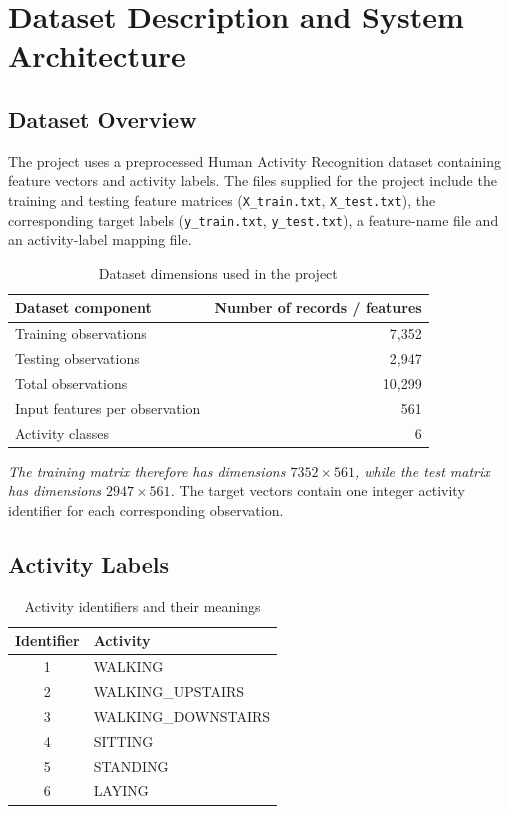\chapter{Dataset Description and System Architecture}
\section{Dataset Overview}
The project uses a preprocessed Human Activity Recognition dataset containing feature vectors and activity labels. The files supplied for the project include the training and testing feature matrices (\texttt{X\_train.txt}, \texttt{X\_test.txt}), the corresponding target labels (\texttt{y\_train.txt}, \texttt{y\_test.txt}), a feature-name file and an activity-label mapping file.

\begin{table}[H]
\centering
\caption{Dataset dimensions used in the project}
\begin{tabular}{lr}
\toprule
\textbf{Dataset component} & \textbf{Number of records / features}\\
\midrule
Training observations & 7,352\\
Testing observations & 2,947\\
Total observations & 10,299\\
Input features per observation & 561\\
Activity classes & 6\\
\bottomrule
\end{tabular}
\end{table}

\emph{The training matrix therefore has dimensions $7352 \times 561$, while the test matrix has dimensions $2947 \times 561$.} The target vectors contain one integer activity identifier for each corresponding observation.

\section{Activity Labels}
\begin{table}[H]
\centering
\caption{Activity identifiers and their meanings}
\begin{tabular}{cl}
\toprule
\textbf{Identifier} & \textbf{Activity}\\
\midrule
1 & WALKING\\
2 & WALKING\_UPSTAIRS\\
3 & WALKING\_DOWNSTAIRS\\
4 & SITTING\\
5 & STANDING\\
6 & LAYING\\
\bottomrule
\end{tabular}
\end{table}

